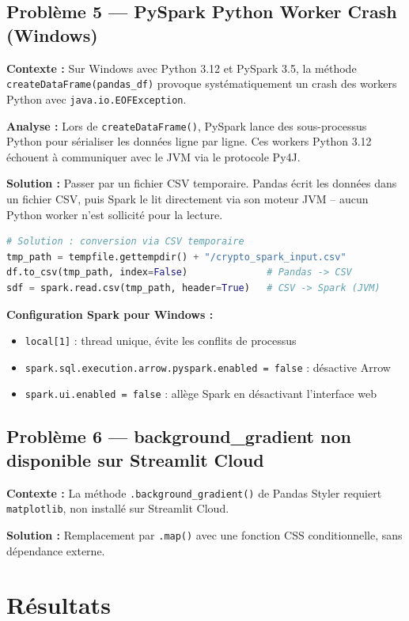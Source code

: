 \documentclass[12pt,a4paper]{article}
\begin{document}
\subsection{Problème 5 --- PySpark Python Worker Crash (Windows)}
\textbf{Contexte :} Sur Windows avec Python 3.12 et PySpark 3.5, la méthode \texttt{createDataFrame(pandas\_df)} provoque systématiquement un crash des workers Python avec \texttt{java.io.EOFException}.

\textbf{Analyse :} Lors de \texttt{createDataFrame()}, PySpark lance des sous-processus Python pour sérialiser les données ligne par ligne. Ces workers Python 3.12 échouent à communiquer avec le JVM via le protocole Py4J.

\textbf{Solution :} Passer par un fichier CSV temporaire. Pandas écrit les données dans un fichier CSV, puis Spark le lit directement via son moteur JVM -- aucun Python worker n'est sollicité pour la lecture.

\begin{lstlisting}[language=Python]
# Solution : conversion via CSV temporaire
tmp_path = tempfile.gettempdir() + "/crypto_spark_input.csv"
df.to_csv(tmp_path, index=False)              # Pandas -> CSV
sdf = spark.read.csv(tmp_path, header=True)   # CSV -> Spark (JVM)
\end{lstlisting}

\textbf{Configuration Spark pour Windows :}
\begin{itemize}[noitemsep]
    \item \texttt{local[1]} : thread unique, évite les conflits de processus
    \item \texttt{spark.sql.execution.arrow.pyspark.enabled = false} : désactive Arrow
    \item \texttt{spark.ui.enabled = false} : allège Spark en désactivant l'interface web
\end{itemize}

\subsection{Problème 6 --- background\_gradient non disponible sur Streamlit Cloud}
\textbf{Contexte :} La méthode \texttt{.background\_gradient()} de Pandas Styler requiert \texttt{matplotlib}, non installé sur Streamlit Cloud.

\textbf{Solution :} Remplacement par \texttt{.map()} avec une fonction CSS conditionnelle, sans dépendance externe.

\section{Résultats}
\end{document}
